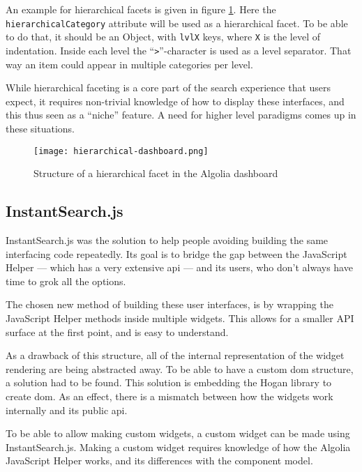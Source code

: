 An example for hierarchical facets is given in figure \ref{figure:hierarchical-facets}. Here the {\tt hierarchicalCategory} \gls{attribute} will be used as a hierarchical facet. To be able to do that, it should be an Object, with {\tt lvlX} keys, where {\tt X} is the level of indentation. Inside each level the ``{\tt >}''-character is used as a level separator. That way an item could appear in multiple categories per level.

While hierarchical faceting is a core part of the search experience that users expect, it requires non-trivial knowledge of how to display these interfaces, and this thus seen as a ``niche'' feature. A need for higher level paradigms comes up in these situations.

\begin{figure}[H]
  \centering
  \texttt{[image: hierarchical-dashboard.png]}
  \caption{Structure of a hierarchical facet in the Algolia dashboard}
  \label{figure:hierarchical-facets}
\end{figure}

\subsection{InstantSearch.js} %
\label{sub:instantsearch_js}

InstantSearch.js was the solution to help people avoiding building the same interfacing code repeatedly. Its goal is to bridge the gap between the JavaScript Helper --- which has a very extensive \acrshort{api} --- and its users, who don't always have time to \gls{grok} all the options.

The chosen new method of building these user interfaces, is by wrapping the JavaScript Helper methods inside multiple widgets. This allows for a smaller API surface at the first point, and is easy to understand.

As a drawback of this structure, all of the internal representation of the widget rendering are being abstracted away. To be able to have a custom \acrshort{dom} structure, a solution had to be found. This solution is embedding the Hogan library to create \acrshort{dom}. As an effect, there is a mismatch between how the widgets work internally and its public \acrshort{api}.

To be able to allow making custom widgets, a custom widget can be made using InstantSearch.js. Making a custom widget requires knowledge of how the Algolia JavaScript Helper works, and its differences with the component model.

